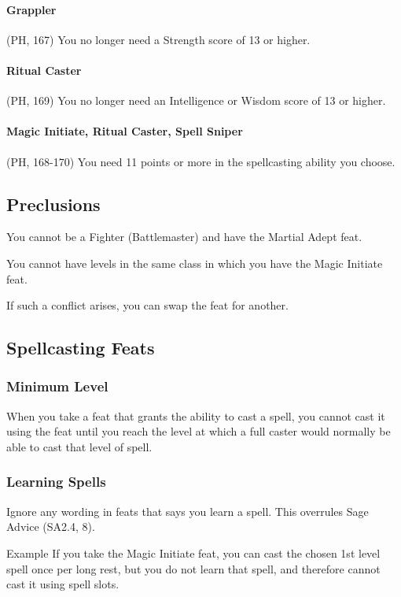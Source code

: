 \documentclass[letterpaper,twocolumn,openany,nodeprecatedcode]{dndbook}
\begin{document}
\paragraph{Grappler} (PH, 167) You no longer need a Strength score of 13 or higher.

\paragraph{Ritual Caster} (PH, 169) You no longer need an Intelligence or Wisdom score of 13 or higher.

\paragraph{Magic Initiate, Ritual Caster, Spell Sniper} (PH, 168-170) You need 11 points or more in the spellcasting ability you choose.

\subsection{Preclusions}
You cannot be a Fighter (Battlemaster) and have the Martial Adept feat.

You cannot have levels in the same class in which you have the Magic Initiate feat.

If such a conflict arises, you can swap the feat for another.

\subsection{Spellcasting Feats}

\subsubsection{Minimum Level}
When you take a feat that grants the ability to cast a spell, you cannot cast it using the feat until you reach the level at which a full caster would normally be able to cast that level of spell.

\subsubsection{Learning Spells}
Ignore any wording in feats that says you learn a spell. This overrules Sage Advice (SA2.4, 8).

\begin{DndComment}{Example}
If you take the Magic Initiate feat, you can cast the chosen 1st level spell once per long rest, but you do not learn that spell, and therefore cannot cast it using spell slots.
\end{DndComment}
\end{document}
